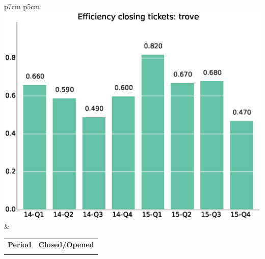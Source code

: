 \documentclass[a4wide,11pt]{article}
\begin{document}


\begin{tabular}{p{7cm} p{5cm}}
    \vspace{0pt} 
    \includegraphics[scale=.35]{figs/bmitrove.eps}
    & 
    \vspace{0pt}
    \begin{tabular}{l|l}%
    \bfseries Period & \bfseries Closed/Opened %
    \csvreader[head to column names]{data/bmitrove.csv}{}%
    {\\ & \bmi}
    \end{tabular}
\end{tabular}
\end{document}
